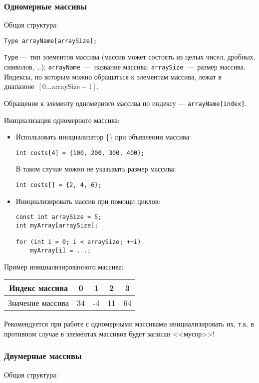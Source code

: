\subsubsection{Одномерные массивы}
Общая структура:

\lstinline|Type arrayName[arraySize];|

\lstinline|Type| --- тип элементов массива
(массив может состоять из целых чисел, дробных, символов, \ldots);
\lstinline|arrayName|~---~название массива; \lstinline|arraySize|~---~размер
массива. Индексы, по которым можно обращаться к элементам массива,
лежат в диапазоне~$\left[ 0 \ldots \text{arraySize} - 1 \right]$.

Обращение к элементу одномерного массива по индексу --- \texttt{arrayName[index]}.

Инициализация одномерного массива:
\begin{itemize}
    \item Использовать инициализатор \{\} при объявлении массива:

    \lstinline|int costs[4] = {100, 200, 300, 400};|

    В таком случае можно не указывать размер массива:

    \lstinline|int costs[] = {2, 4, 6};|

    \item Инициализировать массив при помощи циклов:
    \begin{lstlisting}
const int arraySize = 5;
int myArray[arraySize];

for (int i = 0; i < arraySize; ++i)
    myArray[i] = ...;
    \end{lstlisting}
\end{itemize}

Пример инициализированного массива:

\begin{table}[h]
    \begin{tabular}{|c|c|c|c|c|}
      \hline
      Индекс массива & 0 & 1 & 2 & 3 \\
      \hline
      Значение массива & 34 & -4 & 11 & 64 \\
      \hline
    \end{tabular}
\end{table}

Рекомендуется при работе с одномерными массивами инициализировать их, т.к. в противном случае в элементах массивов будет записан <<мусор>>!

\subsubsection{Двумерные массивы}
Общая структура:

